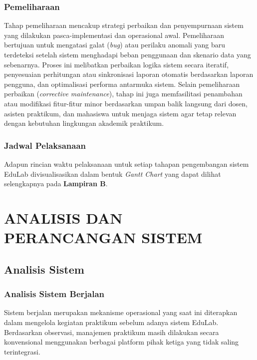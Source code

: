 \documentclass[12pt,a4paper,twoside]{report}
\begin{document}
\subsection{Pemeliharaan}
Tahap pemeliharaan mencakup strategi perbaikan dan penyempurnaan sistem yang dilakukan pasca-implementasi dan operasional awal. Pemeliharaan bertujuan untuk mengatasi galat (\textit{bug}) atau perilaku anomali yang baru terdeteksi setelah sistem menghadapi beban penggunaan dan skenario data yang sebenarnya. Proses ini melibatkan perbaikan logika sistem secara iteratif, penyesuaian perhitungan atau sinkronisasi laporan otomatis berdasarkan laporan pengguna, dan optimalisasi performa antarmuka sistem. Selain pemeliharaan perbaikan (\textit{corrective maintenance}), tahap ini juga memfasilitasi penambahan atau modifikasi fitur-fitur minor berdasarkan umpan balik langsung dari dosen, asisten praktikum, dan mahasiswa untuk menjaga sistem agar tetap relevan dengan kebutuhan lingkungan akademik praktikum.

\subsection{Jadwal Pelaksanaan}
Adapun rincian waktu pelaksanaan untuk setiap tahapan pengembangan sistem EduLab divisualisasikan dalam bentuk \textit{Gantt Chart} yang dapat dilihat selengkapnya pada \textbf{Lampiran B}.

\chapter{ANALISIS DAN PERANCANGAN SISTEM}

\section{Analisis Sistem}

\subsection{Analisis Sistem Berjalan}

Sistem berjalan merupakan mekanisme operasional yang saat ini diterapkan dalam mengelola kegiatan praktikum sebelum adanya sistem EduLab. Berdasarkan observasi, manajemen praktikum masih dilakukan secara konvensional menggunakan berbagai platform pihak ketiga yang tidak saling terintegrasi.
\end{document}
